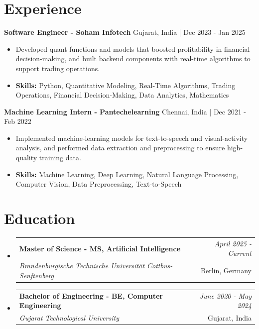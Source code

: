 \documentclass[a4paper,11pt]{article}
\makeatletter
\newcommand{\resumeSubheading}[4]{
\vspace{0.5mm}\item
    \begin{tabular*}{0.98\textwidth}[t]{l@{\extracolsep{\fill}}r}
        \textbf{#1} & \textit{\footnotesize{#4}} \\
        \textit{\footnotesize{#3}} &  \footnotesize{#2}\\
    \end{tabular*}
    \vspace{-2.4mm}
}
\makeatother
\begin{document}
\section{\textbf{Experience}}


\vspace{1mm}
  \textbf{Software Engineer - Soham Infotech} \hfill Gujarat, India | Dec 2023 - Jan 2025
\vspace{-1.5mm} %
\begin{itemize}
  \item Developed quant functions and models that boosted profitability in financial decision-making, and built backend components with real-time algorithms to support trading operations.

\vspace{-2mm}
  \item \textbf{Skills:} Python, Quantitative Modeling, Real-Time Algorithms, Trading Operations, Financial Decision-Making, Data Analytics, Mathematics
\end{itemize}

\vspace{1mm}
  \textbf{Machine Learning Intern - Pantechelearning} \hfill Chennai, India | Dec 2021 - Feb 2022
\vspace{-1.5mm} %
\begin{itemize}
  \item Implemented machine-learning models for text-to-speech and visual-activity analysis, and performed data extraction and preprocessing to ensure high-quality training data.
\vspace{-2mm}
  \item \textbf{Skills:} Machine Learning, Deep Learning, Natural Language Processing, Computer Vision, Data Preprocessing, Text-to-Speech
\end{itemize}\section{\textbf{Education}}
\vspace{-0.4mm}

\begin{itemize}
\resumeSubheading
{Master of Science - MS, Artificial Intelligence }{Berlin, Germany}
{Brandenburgische Technische Universität Cottbus-Senftenberg  }{April 2025 - Current}

\vspace{1.0mm} %
\resumeSubheading
{Bachelor of Engineering - BE, Computer Engineering  }{Gujarat, India}
{Gujarat Technological University }{June 2020 - May 2024}

\end{itemize}
\end{document}
